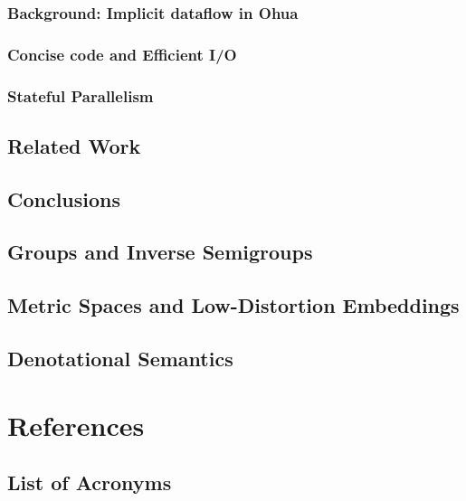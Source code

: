 \documentclass{report}
\begin{document}
\section{Background: Implicit dataflow in Ohua}
 
\section{Concise code and Efficient \ac{I/O}}
\section{Stateful Parallelism}



\chapter{Related Work}


\chapter{Conclusions} 


\appendix

\chapter{Groups and Inverse Semigroups}
\label{appendix:groups}

\chapter{Metric Spaces and Low-Distortion Embeddings}
\label{appendix:metric}

\chapter{Denotational Semantics}
\label{appendix:semantics}


%
%
\clearpage
\part{References}
\printbibliography[title={Coauthored Publications},keyword={contribution}]
\printbibliography[title={Other References},notkeyword={contribution}]

\listoffigures

\printindex

\chapter*{List of Acronyms}

\clearpage
\end{document}
